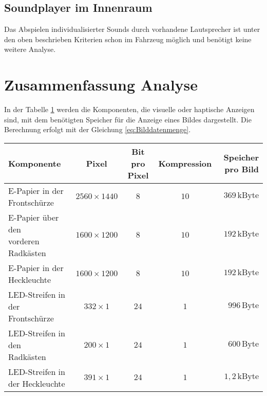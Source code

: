 \subsection{Soundplayer im Innenraum}
Das Abspielen individualisierter Sounds durch vorhandene Lautsprecher ist unter den oben beschrieben Kriterien schon im Fahrzeug möglich und benötigt keine weitere Analyse.
\section{Zusammenfassung Analyse} \label{ZusammendassungAnalyse}
In der Tabelle \ref{tab:Speicherbedarf} werden die Komponenten, die visuelle oder haptische Anzeigen sind, mit dem benötigten Speicher für die Anzeige eines Bildes dargestellt. Die Berechnung erfolgt mit der Gleichung \ref{eq:Bilddatenmenge}.
\begin{table}[hbt]	
	\centering
	\renewcommand{\arraystretch}{1.5}	%
	\label{tab:Speicherbedarf}
	\begin{tabular}{l|cccr}
		\textbf{Komponente} & \parbox[t]{0.1\linewidth}{\centering Pixel} & \parbox[t]{0.11\linewidth}{\centering Bit pro Pixel} & \parbox[t]{0.15\linewidth}{\centering Kompression} & \parbox[t]{0.1\linewidth}{\centering Speicher pro Bild} \\ 
		\hline 
		\hline 
		\parbox[t]{0.3\linewidth}{\RaggedRight E-Papier in der\\ Frontschürze} & $ 2560 \times 1440 $ & $ 8 $ & $ 10 $ & $ 369\,\mathrm{kByte} $\\ 
		\parbox[t]{0.3\linewidth}{\RaggedRight E-Papier über den\\ vorderen Radkästen} & $ 1600 \times 1200 $ & $ 8 $ & $ 10 $ & $ 192\,\mathrm{kByte} $ \\
		\parbox[t]{0.3\linewidth}{\RaggedRight E-Papier in der\\ Heckleuchte} & $ 1600 \times 1200 $ & $ 8 $ & $ 10 $ & $ 192\,\mathrm{kByte} $ \\
		\parbox[t]{0.3\linewidth}{\RaggedRight LED-Streifen in der Frontschürze} & $ 332 \times 1 $ & $ 24 $ & $ 1 $ & $ 996\,\mathrm{Byte} $ \\
		\parbox[t]{0.3\linewidth}{\RaggedRight LED-Streifen in den\\ Radkästen} & $ 200 \times 1 $ & $ 24 $ & $ 1 $ & $ 600\,\mathrm{Byte} $\\ 
		\parbox[t]{0.3\linewidth}{\RaggedRight LED-Streifen in der Heckleuchte} & $ 391 \times 1 $ & $ 24 $ & $ 1 $ & $ 1,2\,\mathrm{kByte} $ \\ 

\end{tabular}
\end{table}
